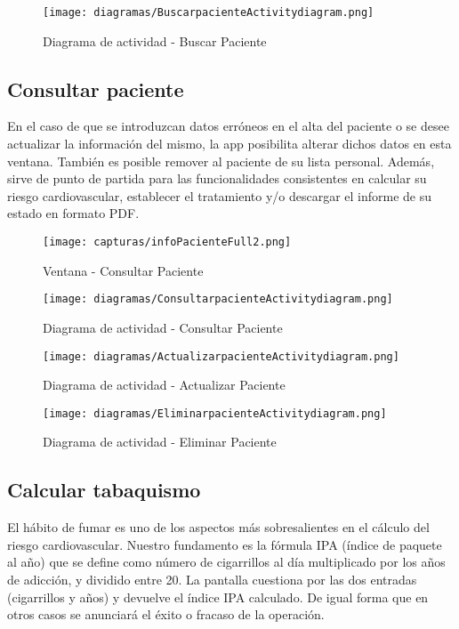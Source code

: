 \documentclass[11pt,spanish,
		listoftables,listoffigures]
		{tfgplantilla}
\begin{document}
\newpage
\begin{figure}[H]
\centering
\texttt{[image: diagramas/BuscarpacienteActivitydiagram.png]}
\caption{Diagrama de actividad - Buscar Paciente}
\end{figure}

\newpage
\subsection {Consultar paciente}

En el caso de que se introduzcan datos erróneos en el alta del paciente o se desee actualizar la información del mismo, la app posibilita alterar dichos datos en esta ventana. También es posible remover al paciente de su lista personal. Además, sirve de punto de partida para las funcionalidades consistentes en calcular su riesgo cardiovascular, establecer el tratamiento y/o descargar el informe de su estado en formato PDF.

\begin{figure}[H]
\centering
\texttt{[image: capturas/infoPacienteFull2.png]}
\caption{Ventana - Consultar Paciente}
\end{figure}

\begin{figure}[H]
\centering
\texttt{[image: diagramas/ConsultarpacienteActivitydiagram.png]}
\caption{Diagrama de actividad - Consultar Paciente}
\end{figure}

\begin{figure}[H]
\centering
\texttt{[image: diagramas/ActualizarpacienteActivitydiagram.png]}
\caption{Diagrama de actividad - Actualizar Paciente}
\end{figure}

\begin{figure}[H]
\centering
\texttt{[image: diagramas/EliminarpacienteActivitydiagram.png]}
\caption{Diagrama de actividad - Eliminar Paciente}
\end{figure}

\subsection {Calcular tabaquismo}

El hábito de fumar es uno de los aspectos más sobresalientes en el cálculo del riesgo cardiovascular. Nuestro fundamento es la fórmula  IPA (índice de paquete al año) que se define como número de cigarrillos al día multiplicado por los años de adicción, y dividido entre 20. La pantalla cuestiona por las dos entradas (cigarrillos y años) y devuelve el índice IPA calculado. De igual forma que en otros casos se anunciará el éxito o fracaso de la operación.
\end{document}
